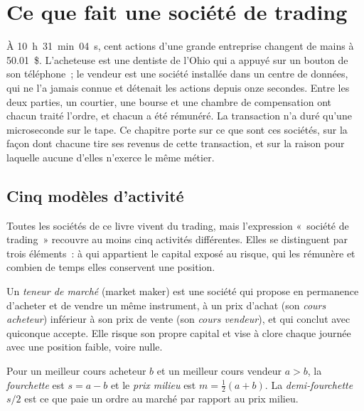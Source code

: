 \chapter{Ce que fait une société de trading}\label{ch:m1:what-a-trading-firm-does}

À 10~h~31~min~04~s, cent actions d'une grande entreprise changent de mains à 50.01~\$.
L'acheteuse est une dentiste de l'Ohio qui a appuyé sur un bouton de son téléphone~; le vendeur est
une société installée dans un centre de données, qui ne l'a jamais connue et détenait les actions depuis
onze secondes. Entre les deux parties, un courtier, une bourse et une chambre de compensation ont chacun
traité l'ordre, et chacun a été rémunéré. La transaction n'a duré qu'une microseconde sur le
tape. Ce chapitre porte sur ce que sont ces sociétés, sur la façon dont chacune tire ses revenus
de cette transaction, et sur la raison pour laquelle aucune d'elles n'exerce le même métier.

\section{Cinq modèles d'activité}

Toutes les sociétés de ce livre vivent du trading, mais l'expression «~société de trading~» recouvre au
moins cinq activités différentes. Elles se distinguent par trois éléments~: à qui appartient le capital
exposé au risque, qui les rémunère et combien de temps elles conservent une position.

\begin{definition}\label{def:m1:what-a-trading-firm-does:market-maker}
Un \emph{teneur de marché} (market maker) est une société qui propose en permanence
d'acheter et de vendre un même instrument, à un prix d'achat (son
\emph{cours acheteur}) inférieur à son prix de vente (son \emph{cours vendeur}), et qui conclut avec quiconque accepte.
Elle risque son propre capital et vise à clore chaque journée avec une position faible,
voire nulle.
\end{definition}

\begin{definition}\label{def:m1:what-a-trading-firm-does:spread}
Pour un meilleur cours acheteur $b$ et un meilleur cours vendeur $a > b$, la
\emph{fourchette} est $s = a - b$ et le
\emph{prix milieu} est $m = \tfrac12(a+b)$. La
\emph{demi-fourchette} $s/2$ est ce que paie un ordre au marché par rapport au prix milieu.
\end{definition}

